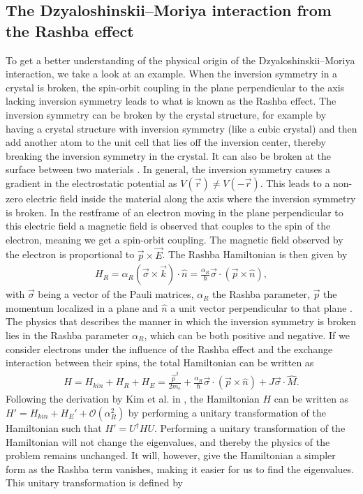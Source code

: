 \documentclass[12pt, a4paper, twoside, openright]{article}		%
\DeclareRobustCommand{\orderof}{\ensuremath{\mathcal{O}}}
\numberwithin{equation}{section}
\begin{document}
\subsection{The Dzyaloshinskii--Moriya interaction from the Rashba effect}
To get a better understanding of the physical origin of the Dzyaloshinskii--Moriya interaction, we take a look at an example. When the inversion symmetry in a crystal is broken, the spin-orbit coupling in the plane perpendicular to the axis lacking inversion symmetry leads to what is known as the Rashba effect. The inversion symmetry can be broken by the crystal structure, for example by having a crystal structure with inversion symmetry (like a cubic crystal) and then add another atom to the unit cell that lies off the inversion center, thereby breaking the inversion symmetry in the crystal. It can also be broken at the surface between two materials \cite{Heide2006}. In general, the inversion symmetry causes a gradient in the electrostatic potential as $V(\vec{r}) \neq V(-\vec{r})$. This leads to a non-zero electric field inside the material along the axis where the inversion symmetry is broken. In the restframe of an electron moving in the plane perpendicular to this electric field a magnetic field is observed that couples to the spin of the electron, meaning we get a spin-orbit coupling. The magnetic field observed by the electron is proportional to $\vec{p}\times\vec{E}$. The Rashba Hamiltonian is then given by
\begin{align}
\label{eq:RashbaH}
H_R = \alpha_R (\vec{\sigma} \times \vec{k})\cdot \hat{n} = \frac{\alpha_R}{\hbar} \vec{\sigma}\cdot(\vec{p}\times\hat{n}),
\end{align}
with $\vec{\sigma}$ being a vector of the Pauli matrices, $\alpha_R$ the Rashba parameter, $\vec{p}$ the momentum localized in a plane and $\hat{n}$ a unit vector perpendicular to that plane \cite{BychovRashba1984}. The physics that describes the manner in which the inversion symmetry is broken lies in the Rashba parameter $\alpha_R$, which can be both positive and negative. If we consider electrons under the influence of the Rashba effect and the exchange interaction between their spins, the total Hamiltonian can be written as
\begin{align}
\label{eq:RashbaModel}
H = H_{kin} + H_R + H_E = \frac{\vec{p}^2}{2m_e} + \frac{\alpha_R}{\hbar} \vec{\sigma}\cdot(\vec{p}\times\hat{n}) + J \vec{\sigma}\cdot\hat{M}.
\end{align}
Following the derivation by Kim et al. in \cite{DMIfromRashba_Kim}, the Hamiltonian $H$ can be written as $H'=H_{kin}+H_E'+\orderof(\alpha_R^2)$ by performing a unitary transformation of the Hamiltonian such that $H' = U^{\dagger}HU$. Performing a unitary transformation of the Hamiltonian will not change the eigenvalues, and thereby the physics of the problem remains unchanged. It will, however, give the Hamiltonian a simpler form as the Rashba term vanishes, making it easier for us to find the eigenvalues. This unitary transformation is defined by
\end{document}

